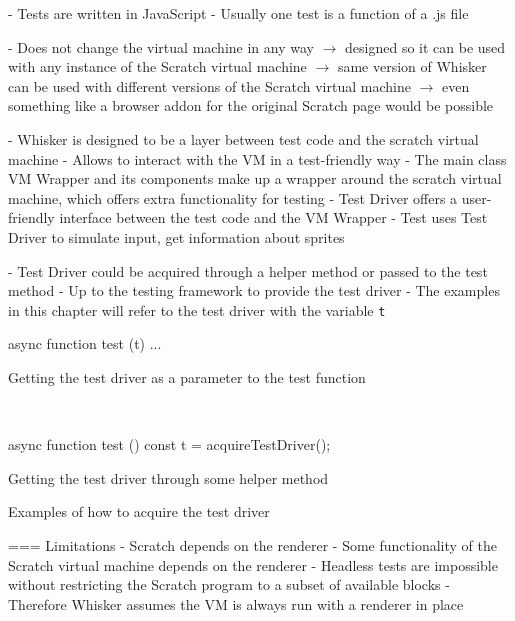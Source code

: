 - Tests are written in JavaScript
- Usually one test is a function of a .js file

- Does not change the virtual machine in any way
    $\rightarrow$ designed so it can be used with any instance of the Scratch virtual machine
    $\rightarrow$ same version of Whisker can be used with different versions of the Scratch virtual machine
    $\rightarrow$ even something like a browser addon for the original Scratch page would be possible

- Whisker is designed to be a layer between test code and the scratch virtual machine
- Allows to interact with the VM in a test-friendly way
- The main class VM Wrapper and its components make up a wrapper around the scratch virtual machine,
  which offers extra functionality for testing
- Test Driver offers a user-friendly interface between the test code and the VM Wrapper
- Test uses Test Driver to simulate input, get information about sprites

- Test Driver could be acquired through a helper method or passed to the test method
- Up to the testing framework to provide the test driver
- The examples in this chapter will refer to the test driver with the variable \texttt{t}

\begin{listing}[ht]
    \centering
    \begin{minipage}[t]{.45\textwidth}
        \begin{javascriptcode}
            async function test (t) {
                ...
            }
        \end{javascriptcode}
        \vspace{-\bigskipamount}
        Getting the test driver as a parameter to the test function
    \end{minipage}
    ~
    \begin{minipage}[t]{.45\textwidth}
        \begin{javascriptcode}
            async function test () {
                const t = acquireTestDriver();
            }
        \end{javascriptcode}
        \vspace{-\bigskipamount}
        Getting the test driver through some helper method
    \end{minipage}
    \caption{Examples of how to acquire the test driver}
    \label{fig:examples_of_how_to_acquire_the_test_driver}
\end{listing}

=== Limitations
- Scratch depends on the renderer
    - Some functionality of the Scratch virtual machine depends on the renderer
    - Headless tests are impossible without restricting the Scratch program to a subset of available blocks
- Therefore Whisker assumes the VM is always run with a renderer in place

